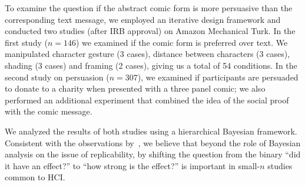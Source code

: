 



To examine the question if the abstract comic form is more persuasive than the corresponding text message, we employed an iterative design framework and conducted two studies (after IRB approval) on Amazon Mechanical Turk. In the first study ($n=146$) we examined if the comic form is preferred over text. We manipulated character gesture (3 cases), distance between characters (3 cases), shading (3 cases) and framing (2 cases), giving us a total of 54 conditions. In the second study on persuasion ($n=307$), we examined if participants are persuaded to donate to a charity when presented with a three panel comic; we also performed an additional experiment that combined the idea of the social proof with the comic message.

We analyzed the results of both studies using a hierarchical Bayesian framework. Consistent with the observations by~\textcite{Kay2016}, we believe that beyond the role of Bayesian analysis on the issue of replicability, by shifting the question from the binary ``did it have an effect?'' to ``how strong is the effect?'' is important in small-$n$ studies common to HCI. 


